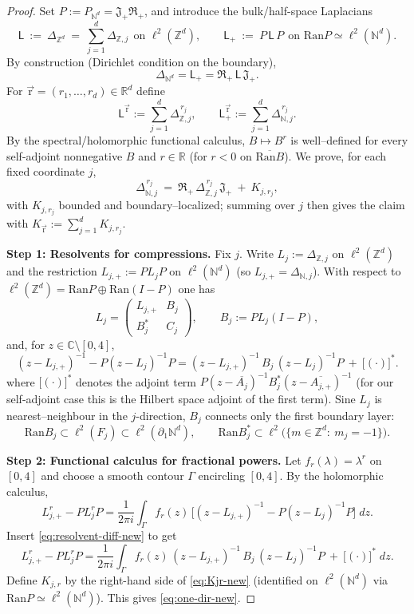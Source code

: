 \documentclass[10pt]{amsart}
\newcommand{\R}{{\mathbb{R}}}
\newcommand{\C}{{\mathbb{C}}}
\newcommand{\Z}{{\mathbb{Z}}}
\newcommand{\N}{{\mathbb{N}}}
\newcommand{\1}{{\mathbb{I}}}
\newcommand{\Ran}{\mathrm{Ran}}
\numberwithin{equation}{section}
\begin{document}
\begin{proof}
Set $P:=P_{\N^d}=\mathfrak J_+ \mathfrak R_+$, and introduce the bulk/half-space Laplacians
\[
\mathsf L \ :=\ \Delta_{\Z^d}\ =\ \sum_{j=1}^d \Delta_{\Z,j}\ \ \text{on }\ell^2(\Z^d),\qquad
\mathsf L_+\ :=\ P\,\mathsf L\,P\ \ \text{on }\Ran P\simeq\ell^2(\N^d).
\]
By construction (Dirichlet condition on the boundary),
\[
\Delta_{\N^d}=\mathsf L_+=\mathfrak R_+\,\mathsf L\,\mathfrak J_+.
\]
For $\vec{\mathrm{r}}=(r_1,\dots,r_d)\in\R^d$ define
\[
\mathsf L^{\vec{\mathrm{r}}}:=\sum_{j=1}^d \Delta_{\Z,j}^{\,r_j},
\qquad
\mathsf L_+^{\vec{\mathrm{r}}}:=\sum_{j=1}^d \Delta_{\N,j}^{\,r_j}.
\]
By the spectral/holomorphic functional calculus, $B\mapsto B^{r}$ is well--defined for every self-adjoint nonnegative $B$ and $r\in\R$ (for $r<0$ on $\overline{\Ran B}$). We prove, for each fixed coordinate $j$,
\begin{equation}\label{eq:one-dir-new}
\Delta_{\N,j}^{\,r_j}\ =\ \mathfrak R_+\,\Delta_{\Z,j}^{\,r_j}\,\mathfrak J_+\ +\ K_{j,r_j},
\end{equation}
with $K_{j,r_j}$ bounded and boundary--localized; summing over $j$ then gives the claim with $K_{\vec{\mathrm{r}}}:=\sum_{j=1}^d K_{j,r_j}$.

\medskip\noindent\textbf{Step 1: Resolvents for compressions.}
Fix $j$. Write $L_j:=\Delta_{\Z,j}$ on $\ell^2(\Z^d)$ and the restriction  $L_{j,+}:=P L_j P$ on $\ell^2(\N^d)$ (so $L_{j,+}=\Delta_{\N,j}$). With respect to $\ell^2(\Z^d)=\Ran P\oplus\Ran(I-P)$ one has
\[
L_j=\begin{pmatrix} L_{j,+} & B_j \\ B_j^* & C_j\end{pmatrix},
\qquad
B_j:=P L_j (I-P),
\]
and, for $z\in\C\setminus[0,4]$,
\begin{equation}\label{eq:resolvent-diff-new}
(z-L_{j,+})^{-1}-P(z-L_j)^{-1}P
=(z-L_{j,+})^{-1}\,B_j\,(z-L_j)^{-1}P\ +\ \big[(\cdot)\big]^*.
\end{equation}where $\big[(\cdot)\big]^*$ denotes the adjoint term $P(z-\overline{A_j})^{-1}B_j^*(z-\overline{A_{j,+}})^{-1}$ (for our self-adjoint case this is the Hilbert space adjoint of the first term).
Sine $L_j$ is nearest--neighbour in the $j$-direction, $B_j$ connects only the first boundary layer:
\[
\Ran B_j\subset \ell^2(F_j)\subset \ell^2(\partial_1\N^d),\qquad
\Ran B_j^*\subset \ell^2\big(\{m\in\Z^d:\ m_j=-1\}\big).
\]

\medskip\noindent\textbf{Step 2: Functional calculus for fractional powers.}
Let $f_r(\lambda)=\lambda^r$ on $[0,4]$ and choose a smooth contour $\Gamma$ encircling $[0,4]$. By the holomorphic calculus,
\[
L_{j,+}^r - P L_j^r P
=\frac{1}{2\pi i}\int_{\Gamma} f_r(z)\,\Big[(z-L_{j,+})^{-1}-P(z-L_j)^{-1}P\Big]\;dz.
\]
Insert \eqref{eq:resolvent-diff-new} to get
\begin{equation}\label{eq:Kjr-new}
L_{j,+}^r - P L_j^r P
=\frac{1}{2\pi i}\int_{\Gamma} f_r(z)\,(z-L_{j,+})^{-1}\,B_j\,(z-L_j)^{-1}P\ +\ \big[(\cdot)\big]^*\;dz.
\end{equation}
Define $K_{j,r}$ by the right-hand side of \eqref{eq:Kjr-new} (identified on $\ell^2(\N^d)$ via $\Ran P\simeq\ell^2(\N^d)$). This gives \eqref{eq:one-dir-new}.


\end{proof}
\end{document}
